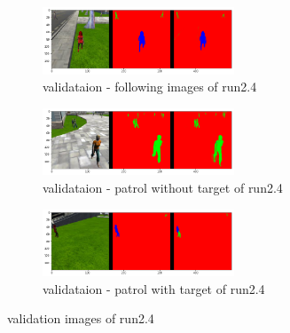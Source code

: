 \documentclass[paper=a4, fontsize=11pt]{scrartcl} %
\numberwithin{equation}{section} %
\numberwithin{figure}{section} %
\numberwithin{table}{section} %
\begin{document}
 \begin{figure}[ht]
	 \begin{subfigure}{0.33\textwidth}
	 \includegraphics[width=0.9\linewidth, height=2cm]{./imgs/following_images24.png} 
	 \caption{validataion - following images of run2.4}
	 \label{fig:subfollowing_images24}
	 \end{subfigure}
	 \begin{subfigure}{0.33\textwidth}
	 \includegraphics[width=0.9\linewidth, height=2cm]{./imgs/patrol_non_targ24.png}
	 \caption{validataion - patrol without target of run2.4}
	 \label{fig:subpatrol_non_targ24}
	 \end{subfigure}
	 \begin{subfigure}{0.33\textwidth}
	 \includegraphics[width=0.9\linewidth, height=2cm]{./imgs/patrol_with_targ24.png}
	 \caption{validataion - patrol with target of run2.4}
	 \label{fig:subpatrol_with_targ24}
	 \end{subfigure}
 
	 \caption{validation images of run2.4}
	 \label{fig:outputimages24}
 \end{figure}
\end{document}
